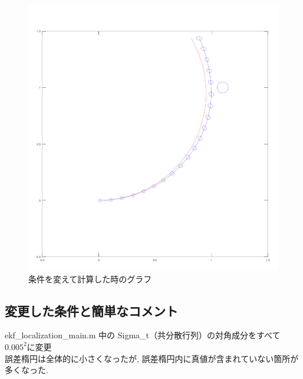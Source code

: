 \documentclass{jsarticle}
\begin{document}
\begin{figure}[H]
  \centering
   \includegraphics[scale=0.5]{./fig/2.png}
   \caption{条件を変えて計算した時のグラフ}
\end{figure}

\subsection*{変更した条件と簡単なコメント}
ekf\_localization\_main.m 中の Sigma\_t（共分散行列）の対角成分をすべて\( 0.005^2 \)に変更\\
\hspace*{1zw}誤差楕円は全体的に小さくなったが, 誤差楕円内に真値が含まれていない箇所が多くなった.
\end{document}
